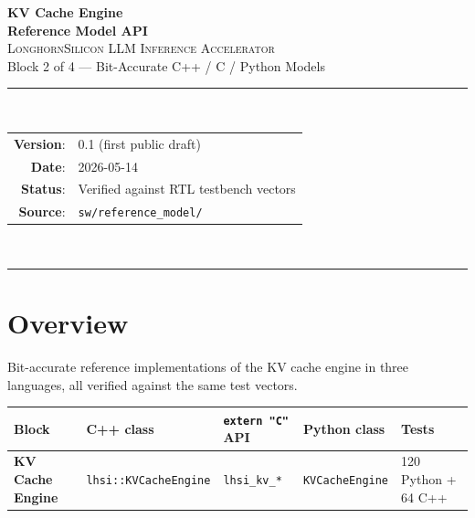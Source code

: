 \documentclass[11pt]{article}
\begin{document}
\thispagestyle{empty}
\begin{center}
\vspace*{1.2in}
{\Huge\bfseries KV Cache Engine}\\[0.4em]
{\LARGE\bfseries Reference Model API}\\[1.2em]

{\large \textsc{LonghornSilicon LLM Inference Accelerator}}\\[0.4em]
{\large Block 2 of 4 --- Bit-Accurate C++ / C / Python Models}\\[2em]

\rule{0.7\textwidth}{0.4pt}\\[1em]

\begin{tabular}{rl}
\textbf{Version}:    & 0.1 (first public draft) \\
\textbf{Date}:       & 2026-05-14 \\
\textbf{Status}:     & Verified against RTL testbench vectors \\
\textbf{Source}:     & \texttt{sw/reference\_model/} \\
\end{tabular}\\[1em]
\rule{0.7\textwidth}{0.4pt}
\vfill
\end{center}
\clearpage

\tableofcontents
\clearpage

\section{Overview}
\label{sec:overview}

Bit-accurate reference implementations of the KV cache engine in three
languages, all verified against the same test vectors.

\begin{table}[h]
\centering
\small
\begin{tabular}{@{}l l l l l@{}}
\toprule
Block & C++ class & \texttt{extern "C"} API & Python class & Tests \\
\midrule
\textbf{KV Cache Engine} & \texttt{lhsi::KVCacheEngine} & \texttt{lhsi\_kv\_*} & \texttt{KVCacheEngine} & 120 Python + 64 C++ \\
\bottomrule
\end{tabular}
\end{table}
\end{document}
